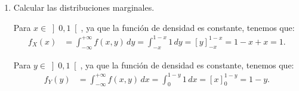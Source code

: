 \begin{ejercicio}
\begin{enumerate}
\begin{itemize}
            \item \ul{Si $x\in \left]1,\infty\right[$ \quad y \quad $y\in \left]1,\infty\right[$} (zona $R_8$):
            \begin{align*}
                F_{(X,Y)}(x, y) &= \int_{-\infty}^x \int_{-\infty}^y f(u, v) \, du \, dv = 1
            \end{align*}
        \end{itemize}

        Por tanto, tenemos que:
        \begin{equation*}
            F_{(X,Y)}(x, y) = \begin{cases}
                0, & x\leq 0 \text{ o } x+y\leq 0,\ (R_3),\\
                xy+\dfrac{x^2}{2}, & x\in \left]0,1\right[ \text{ y } y\in \left]0,1\right[ \text{ y } x+y\leq 1,\ (R_1),\\
                \dfrac{(x+y)^2}{2}, & x\in \left]0,1\right[ \text{ y } y\in \left]-1,0\right[ \text{ y } x+y\geq 0,\ (R_2),\\
                x-\dfrac{(1-y)^2}{2}, & x\in \left]0,1\right[ \text{ y } y\in \left]0,1\right[ \text{ y } x+y\geq 1,\ (R_4),\\
                x, & x\in \left]0,1\right[ \text{ y } y\geq 1,\ (R_5),\\
                1-\dfrac{(1-y)^2}{2}, & x\in \left]1,\infty\right[ \text{ y } y\in \left]0,1\right[,\ (R_6),\\
                y+\dfrac{y^2+1}{2}, & x\in \left]1,\infty\right[ \text{ y } y\in \left]-1,0\right[,\ (R_7),\\
                1, & x\in \left]1,\infty\right[ \text{ y } y\geq 1,\ (R_8).
            \end{cases}
        \end{equation*}

        \item Calcular las distribuciones marginales.
        
        Para $x\in \left]0,1\right[$, ya que la función de densidad es constante, tenemos que:
        \begin{align*}
            f_X(x) &= \int_{-\infty}^{+\infty} f(x, y) \, dy = \int_{-x}^{1-x} 1 \, dy = \left[y\right]_{-x}^{1-x} = 1-x+x = 1.
        \end{align*}

        Para $y\in \left]0,1\right[$, ya que la función de densidad es constante, tenemos que:
        \begin{align*}
            f_Y(y) &= \int_{-\infty}^{+\infty} f(x, y) \, dx = \int_{0}^{1-y} 1 \, dx = \left[x\right]_{0}^{1-y} = 1-y.
        \end{align*}


\end{enumerate}
\end{ejercicio}
